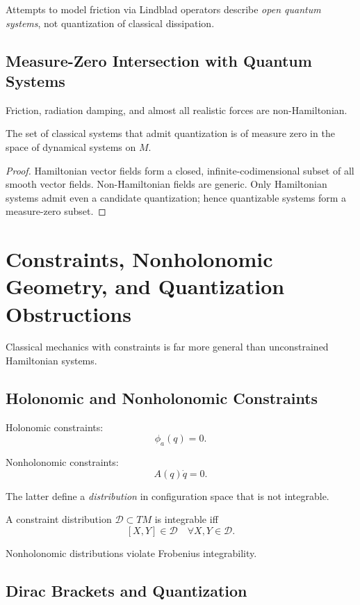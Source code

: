 \documentclass[12pt,oneside]{book}
\begin{document}
Attempts to model friction via Lindblad operators describe \emph{open quantum systems},
not quantization of classical dissipation.

\section{Measure-Zero Intersection with Quantum Systems}

Friction, radiation damping, and almost all realistic forces are non-Hamiltonian.

\begin{theorem}
The set of classical systems that admit quantization is of measure zero in the space of dynamical systems on $M$.
\end{theorem}

\begin{proof}
Hamiltonian vector fields form a closed, infinite-codimensional subset of all smooth vector fields.
Non-Hamiltonian fields are generic.
Only Hamiltonian systems admit even a candidate quantization; hence quantizable systems form a measure-zero subset.
\end{proof}

\chapter{Constraints, Nonholonomic Geometry, and Quantization Obstructions}

Classical mechanics with constraints is far more general than unconstrained Hamiltonian systems.

\section{Holonomic and Nonholonomic Constraints}

Holonomic constraints:
\[
\phi_a(q) = 0.
\]

Nonholonomic constraints:
\[
A(q)\dot q = 0.
\]

The latter define a \emph{distribution} in configuration space that is not integrable.

\begin{definition}
A constraint distribution $\mathcal{D}\subset TM$ is integrable iff
\[
[X,Y]\in \mathcal{D}\quad \forall X,Y\in\mathcal{D}.
\]
\end{definition}

Nonholonomic distributions violate Frobenius integrability.

\section{Dirac Brackets and Quantization}
\end{document}

